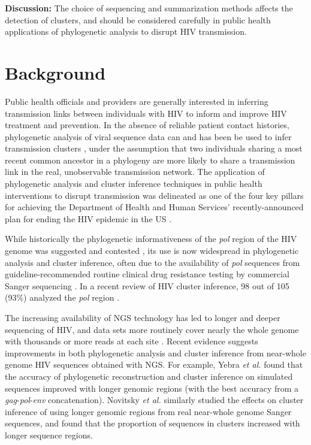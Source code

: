 \documentclass[letterpaper]{article}
\begin{document}
\textbf{Discussion:} The choice of sequencing and summarization methods affects the detection of clusters, and should be considered carefully in public health applications of phylogenetic analysis to disrupt HIV transmission.

\section*{Background}

Public health officials and providers are generally interested in inferring transmission links between individuals with HIV to inform and improve HIV treatment and prevention. In the absence of reliable patient contact histories, phylogenetic analysis of viral sequence data can and has been be used to infer transmission clusters \parencite{leitner}, under the assumption that two individuals sharing a most recent common ancestor in a phylogeny are more likely to share a transmission link in the real, unobservable transmission network. The application of phylogenetic analysis and cluster inference techniques in public health interventions to disrupt transmission was delineated as one of the four key pillars for achieving the Department of Health and Human Services' recently-announced plan for ending the HIV epidemic in the US \parencite{fauci}.

While historically the phylogenetic informativeness of the \emph{pol} region of the HIV genome was suggested and contested \parencite{hue, sturmer}, its use is now widespread in phylogenetic analysis and cluster inference, often due to the availability of \emph{pol} sequences from guideline-recommended routine clinical drug resistance testing by commercial Sanger sequencing \parencite{dhhs}. In a recent review of HIV cluster inference, 98 out of 105 (93\%) analyzed the \emph{pol} region \parencite{hassan}.

The increasing availability of NGS technology has led to longer and deeper sequencing of HIV, and data sets more routinely cover nearly the whole genome with thousands or more reads at each site \parencite{voelkerding}. Recent evidence suggests improvements in both phylogenetic analysis and cluster inference from near-whole genome HIV sequences obtained with NGS. For example, Yebra \emph{et al.} \parencite{yebra} found that the accuracy of phylogenetic reconstruction and cluster inference on simulated sequences improved with longer genomic regions (with the best accuracy from a \emph{gag}-\emph{pol}-\emph{env} concatenation). Novitsky \emph{et al.} \parencite{novitsky} similarly studied the effects on cluster inference of using longer genomic regions from real near-whole genome Sanger sequences, and found that the proportion of sequences in clusters increased with longer sequence regions.
\end{document}
